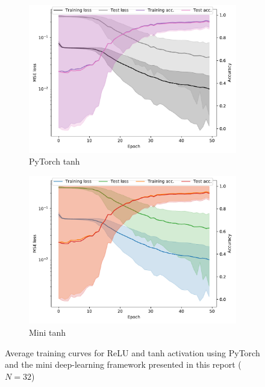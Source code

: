 \documentclass[prl, article, twocolumn]{revtex4-1}
\begin{document}
\begin{figure}[h!]
\begin{subfigure}[]{0.45\linewidth}
        \includegraphics[width=\textwidth]{figures/pytorch/tanh_history.pdf}
        \caption{PyTorch tanh}
    \end{subfigure}
    \begin{subfigure}[]{0.45\linewidth}
        \includegraphics[width=\textwidth]{figures/mini/tanh_history.pdf}
        \caption{Mini tanh}
    \end{subfigure}
    \caption{Average training curves for ReLU and tanh activation using PyTorch and the mini deep-learning framework presented in this report ($N=32$)}
    \label{fig:training}
\end{figure}
\end{document}
